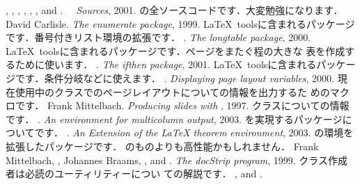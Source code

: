 \begin{myreferences}
%
 , , 
 , , 
 , , and 
 . \newblock%
  {\em \LaTeXe\ \ Sources}, 2001. 
  \sanko {}
  \sanko \LaTeXe の全ソースコードです．大変勉強になります．
%
 David Carlisle. \newblock
  {\em The {enumerate} package}, 1999. 
  \sanko {}
  \sanko \LaTeX\ toolsに含まれるパッケージです．番号付きリスト環境の拡張です．
%
 \iiiemdash. \newblock
  {\em The {longtable} package}, 2000. 
  \sanko {}
  \sanko \LaTeX\ toolsに含まれるパッケージです．ページをまたぐ程の大きな
  表を作成するために使います．
%
 \iiiemdash. \newblock
  {\em The {ifthen} package}, 2001.
  \sanko {}
  \sanko \LaTeX\ toolsに含まれるパッケージです．条件分岐などに使えます．
%
 . \newblock
  {\em Displaying page layout variables}, 2000.
  \sanko {}
  \sanko 現在使用中のクラスでのページレイアウトについての情報を出力するた
  めのマクロです．
%
 Frank Mittelbach. \newblock
  {\em Producing slides with {\LaTeXe}}, 1997.
  \sanko {}
  \sanko {}クラスについての情報です．
%
 \iiiemdash. \newblock
  {\em An environment for multicolumn output}, 2003.
  \sanko {}
  \sanko {}を実現するパッケージについてです．
%
 \iiiemdash. \newblock
  {\em An Extension of the {\LaTeX} theorem environment}, 2003.
 \sanko {}
 \sanko {\LaTeX}の環境を拡張したパッケージです．
 {\AmSLaTeX}のものよりも高性能かもしれません．
%
 Frank Mittelbach, , 
  Johannes Braams, , and
  . \newblock
  {\em The {docStrip} program}, 1999. 
 \sanko {}
 \sanko クラス作成者は必読のユーティリティーについ
  ての解説です．
%
  , 
   and . \newblock

\end{myreferences}
